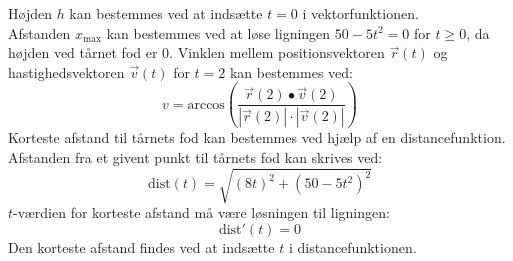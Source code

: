 \documentclass[../main.tex]{subfiles}
\begin{document}
\begin{tcolorbox}[title=Opgave 1,
    colback=blue!1!white,
    colframe=black,
    colbacktitle=blue!25!white,
    coltitle=red!25!black,
    fonttitle=\bfseries,
    subtitle style={boxrule=0.4pt,
    colback=blue!7!white} ]
        Højden \(h\) kan bestemmes ved at indsætte \(t=0\) i vektorfunktionen.\\
        Afstanden \(x_{\text{max}}\) kan bestemmes ved at løse ligningen \(50-5t^2=0\) for \(t \geq 0\), da højden ved tårnet fod er 0.
        Vinklen mellem positionsvektoren \(\vec{r}(t)\) og hastighedsvektoren \(\vec{v}(t)\) for \(t = 2\) kan bestemmes ved:
        \[v = \text{arccos} \left( \frac{\vec{r}(2) \bullet \vec{v}(2)}{|\vec{r}(2)| \cdot |\vec{v}(2)|}\right)\]
        Korteste afstand til tårnets fod kan bestemmes ved hjælp af en distancefunktion. Afstanden fra
        et givent punkt til tårnets fod kan skrives ved:
        \[\text{dist}(t) = \sqrt{(8t)^2+(50-5t^2)^2}\]
        \(t\)-værdien for korteste afstand må være løsningen til ligningen:
        \[\text{dist}'(t)=0\]
        Den korteste afstand findes ved at indsætte \(t\) i distancefunktionen.
\end{tcolorbox}
\end{document}
